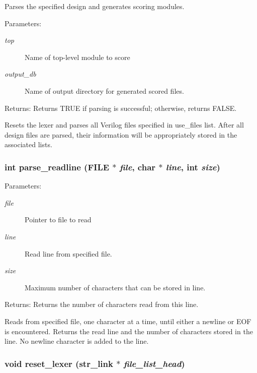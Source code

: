 Parses the specified design and generates scoring modules. 

\begin{Desc}
\item[Parameters:]
\begin{description}
\item[{\em top}]Name of top-level module to score \item[{\em output\_\-db}]Name of output directory for generated scored files.\end{description}
\end{Desc}
\begin{Desc}
\item[Returns:]Returns TRUE if parsing is successful; otherwise, returns FALSE.\end{Desc}
Resets the lexer and parses all Verilog files specified in use\_\-files list. After all design files are parsed, their information will be appropriately stored in the associated lists. 
\subsubsection{\setlength{\rightskip}{0pt plus 5cm}int parse\_\-readline (FILE $\ast$ {\em file}, char $\ast$ {\em line}, int {\em size})}\label{parse_8c_a8}


\begin{Desc}
\item[Parameters:]
\begin{description}
\item[{\em file}]Pointer to file to read \item[{\em line}]Read line from specified file. \item[{\em size}]Maximum number of characters that can be stored in line. \end{description}
\end{Desc}
\begin{Desc}
\item[Returns:]Returns the number of characters read from this line.\end{Desc}
Reads from specified file, one character at a time, until either a newline or EOF is encountered. Returns the read line and the number of characters stored in the line. No newline character is added to the line. 
\subsubsection{\setlength{\rightskip}{0pt plus 5cm}void reset\_\-lexer ({\bf str\_\-link} $\ast$ {\em file\_\-list\_\-head})}\label{parse_8c_a6}


